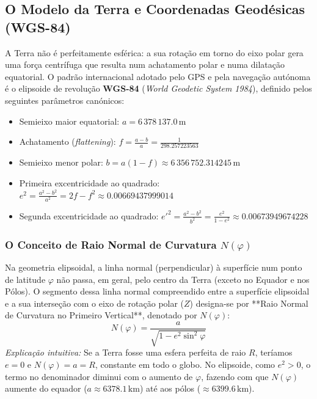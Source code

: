 \documentclass[11pt,a4paper]{article}
\begin{document}
\subsection{O Modelo da Terra e Coordenadas Geodésicas (WGS-84)}
A Terra não é perfeitamente esférica: a sua rotação em torno do eixo polar gera uma força centrífuga que resulta num achatamento polar e numa dilatação equatorial. O padrão internacional adotado pelo GPS e pela navegação autónoma é o elipsoide de revolução \textbf{WGS-84} (\textit{World Geodetic System 1984}), definido pelos seguintes parâmetros canónicos:
\begin{itemize}
    \item Semieixo maior equatorial: $a = 6\,378\,137.0\,\text{m}$
    \item Achatamento (\textit{flattening}): $f = \frac{a - b}{a} = \frac{1}{298.257223563}$
    \item Semieixo menor polar: $b = a(1 - f) \approx 6\,356\,752.314245\,\text{m}$
    \item Primeira excentricidade ao quadrado: $e^2 = \frac{a^2 - b^2}{a^2} = 2f - f^2 \approx 0.00669437999014$
    \item Segunda excentricidade ao quadrado: $e'^2 = \frac{a^2 - b^2}{b^2} = \frac{e^2}{1 - e^2} \approx 0.00673949674228$
\end{itemize}

\subsubsection{O Conceito de Raio Normal de Curvatura $N(\varphi)$}
Na geometria elipsoidal, a linha normal (perpendicular) à superfície num ponto de latitude $\varphi$ não passa, em geral, pelo centro da Terra (exceto no Equador e nos Pólos). O segmento dessa linha normal compreendido entre a superfície elipsoidal e a sua interseção com o eixo de rotação polar ($Z$) designa-se por **Raio Normal de Curvatura no Primeiro Vertical**, denotado por $N(\varphi)$:
\begin{equation}
    \label{eq:normal_radius}
    N(\varphi) = \frac{a}{\sqrt{1 - e^2 \sin^2 \varphi}}
\end{equation}
\textit{Explicação intuitiva:} Se a Terra fosse uma esfera perfeita de raio $R$, teríamos $e=0$ e $N(\varphi) = a = R$, constante em todo o globo. No elipsoide, como $e^2 > 0$, o termo no denominador diminui com o aumento de $\varphi$, fazendo com que $N(\varphi)$ aumente do equador ($a \approx 6378.1\,\text{km}$) até aos pólos ($\approx 6399.6\,\text{km}$).
\end{document}
